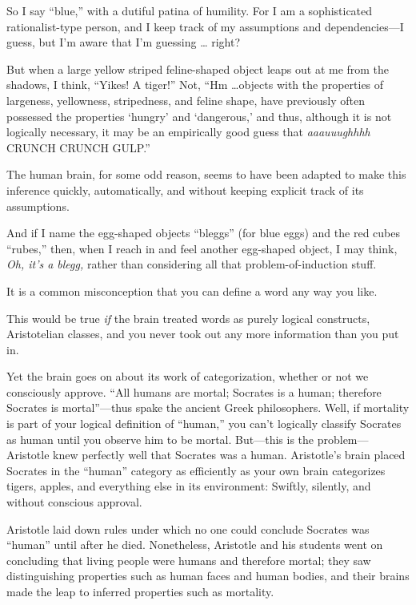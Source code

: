 {
 So I say ``blue,'' with a
dutiful patina of humility. For I am a sophisticated rationalist-type
person, and I keep track of my assumptions and dependencies---I guess,
but I'm aware that I'm guessing \ldots
right?}

{
 But when a large yellow striped feline-shaped object leaps out at
me from the shadows, I think, ``Yikes! A
tiger!'' Not, ``Hm \ldots objects
with the properties of largeness, yellowness, stripedness, and feline
shape, have previously often possessed the properties
`hungry' and
`dangerous,' and thus, although it is
not logically necessary, it may be an empirically good guess that
\textit{aaauuughhhh} CRUNCH CRUNCH GULP.''}

{
 The human brain, for some odd reason, seems to have been adapted
to make this inference quickly, automatically, and without keeping
explicit track of its assumptions.}

{
 And if I name the egg-shaped objects
``bleggs'' (for blue eggs) and the
red cubes ``rubes,'' then, when I
reach in and feel another egg-shaped object, I may think, \textit{Oh,
it's a blegg,} rather than considering all that
problem-of-induction stuff.}

{
 It is a common misconception that you can define a word any way
you like.}

{
 This would be true \textit{if} the brain treated words as purely
logical constructs, Aristotelian classes, and you never took out any
more information than you put in.}

{
 Yet the brain goes on about its work of categorization, whether or
not we consciously approve. ``All humans are mortal;
Socrates is a human; therefore Socrates is
mortal''---thus spake the ancient Greek philosophers.
Well, if mortality is part of your logical definition of
``human,'' you can't
logically classify Socrates as human until you observe him to be
mortal. But---this is the problem---Aristotle knew perfectly well that
Socrates was a human. Aristotle's brain placed Socrates
in the ``human'' category as
efficiently as your own brain categorizes tigers, apples, and
everything else in its environment: Swiftly, silently, and without
conscious approval.}

{
 Aristotle laid down rules under which no one could conclude
Socrates was ``human'' until after
he died. Nonetheless, Aristotle and his students went on concluding
that living people were humans and therefore mortal; they saw
distinguishing properties such as human faces and human bodies, and
their brains made the leap to inferred properties such as mortality.}

